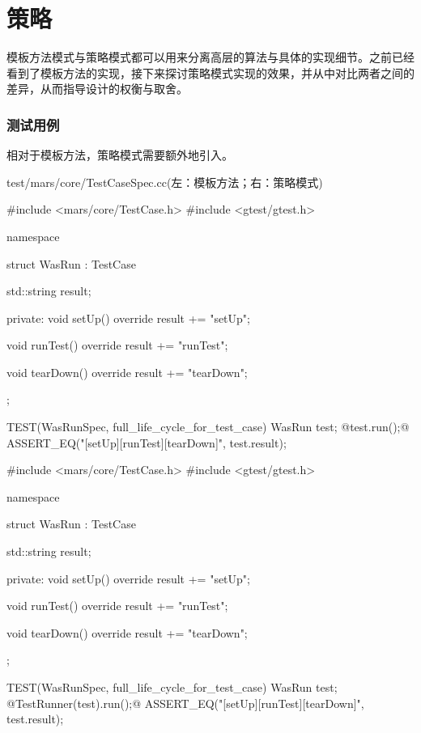 \section{策略}

\begin{content}

模板方法模式与策略模式都可以用来分离高层的算法与具体的实现细节。之前已经看到了模板方法的实现，接下来探讨策略模式实现的效果，并从中对比两者之间的差异，从而指导设计的权衡与取舍。

\subsubsection{测试用例}

相对于模板方法，策略模式需要额外地引入。

\begin{diff}{test/mars/core/TestCaseSpec.cc(左：模板方法；右：策略模式)}
 \begin{minicpp}
#include <mars/core/TestCase.h>
#include <gtest/gtest.h>

namespace {
  struct WasRun : TestCase {
    std::string result;

  private:
    void setUp() override {
      result += "setUp";
    }

    void runTest() override {
      result += "runTest";
    }

    void tearDown() override {
      result += "tearDown";
    }
  };
}

TEST(WasRunSpec, full_life_cycle_for_test_case) {
  WasRun test;
  @test.run();@
  ASSERT_EQ("[setUp][runTest][tearDown]", test.result);
} 
  \end{minicpp}
\tcblower
 \begin{minicpp}
#include <mars/core/TestCase.h>
#include <gtest/gtest.h>

namespace {
  struct WasRun : TestCase {
    std::string result;

  private:
    void setUp() override {
      result += "setUp";
    }

    void runTest() override {
      result += "runTest";
    }

    void tearDown() override {
      result += "tearDown";
    }
  };
}

TEST(WasRunSpec, full_life_cycle_for_test_case) {
  WasRun test;
  @TestRunner(test).run();@
  ASSERT_EQ("[setUp][runTest][tearDown]", test.result);
}
 \end{minicpp} 
\end{diff}


\end{content}

